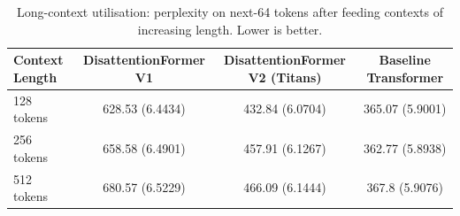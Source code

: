 \begin{table}[h]
\centering
\caption{Long-context utilisation: perplexity on next-64 tokens
after feeding contexts of increasing length. Lower is better.}
\label{tab:longctx}
\begin{tabular}{lccc}
\toprule
\textbf{Context Length} & \textbf{DisattentionFormer V1} & \textbf{DisattentionFormer V2 (Titans)} & \textbf{Baseline Transformer} \\
\midrule
128 tokens & 628.53 (6.4434) & 432.84 (6.0704) & 365.07 (5.9001) \\
256 tokens & 658.58 (6.4901) & 457.91 (6.1267) & 362.77 (5.8938) \\
512 tokens & 680.57 (6.5229) & 466.09 (6.1444) & 367.8 (5.9076) \\
\bottomrule
\end{tabular}
\end{table}
